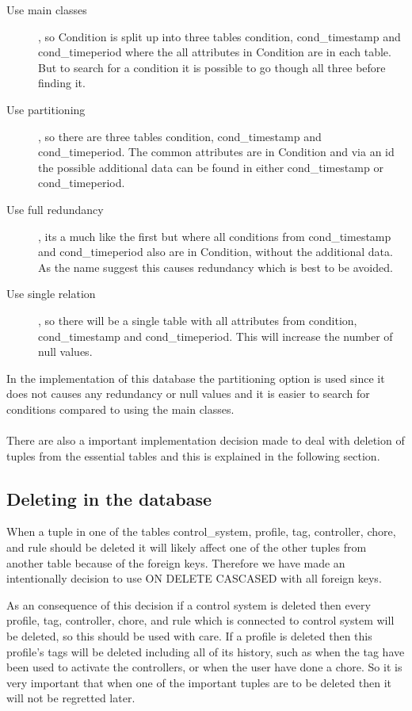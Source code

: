 \begin{description}
	\item[Use main classes], so Condition is split up into three tables condition, cond_timestamp and cond_timeperiod where the all attributes in Condition are in each table. But to search for a condition it is possible to go though all three before finding it. 
	\item[Use partitioning], so there are three tables condition, cond_timestamp and cond_timeperiod. The common attributes are in Condition and via an id the possible additional data can be found in either cond_timestamp or cond_timeperiod.
	\item[Use full redundancy], its a much like the first but where all conditions from cond_timestamp and cond_timeperiod also are in Condition, without the additional data. As the name suggest this causes redundancy which is best to be avoided.
	\item[Use single relation], so there will be a single table with all attributes from condition, cond_timestamp and cond_timeperiod. This will increase the number of null values. 
\end{description}

In the implementation of this database the partitioning option is used since it does not causes any redundancy or null values and it is easier to search for conditions compared to using the main classes.  \\\\


There are also a important implementation decision made to deal with deletion of tuples from the essential tables and this is explained in the following section.
 
\subsection{Deleting in the database}
When a tuple in one of the tables control_system, profile, tag, controller, chore, and rule should be deleted it will likely affect one of the other tuples from another table because of the foreign keys. Therefore we have made an intentionally decision to use ON DELETE CASCASED with all foreign keys.

As an consequence of this decision if a control system is deleted then every profile, tag, controller, chore, and rule which is connected to control system will be deleted, so this should be used with care. 
If a profile is deleted then this profile's tags will be deleted including all of its history, such as when the tag have been used to activate the controllers, or when the user have done a chore. So it is very important that when one of the important tuples are to be deleted then it will not be regretted later. \\\\

